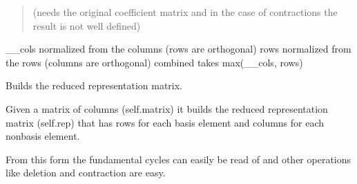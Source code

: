 \documentclass[letterpaper,12pt,english]{sphinxmanual}
\begin{document}
\begin{fulllineitems}
\begin{fulllineitems}
\begin{quote}
\sphinxAtStartPar
(needs the original coefficient matrix and in the case of
contractions the result is not well defined)
\end{quote}

\sphinxAtStartPar
\_\_cols \sphinxhyphen{} normalized from the columns (rows are orthogonal)
rows \sphinxhyphen{} normalized from the rows (columns are orthogonal)
combined \sphinxhyphen{} takes max(\_\_cols, rows)

\end{fulllineitems}


\end{fulllineitems}


\begin{fulllineitems}
\label{\detokenize{api/modules:cbmpy.fluxmodules.matroid.fromMatrix}}
\pysigstartsignatures
\pysiglinewithargsret
{}
{\sphinxparamcomma {}}
{}
\pysigstopsignatures
\sphinxAtStartPar
Builds the reduced representation matrix.

\sphinxAtStartPar
Given a matrix of columns (self.matrix) it builds the reduced representation matrix
(self.rep) that has rows for each basis element and columns for each non\sphinxhyphen{}basis
element.

\sphinxAtStartPar
From this form the fundamental cycles can easily be read of and other operations
like deletion and contraction are easy.

\end{fulllineitems}

\end{document}
